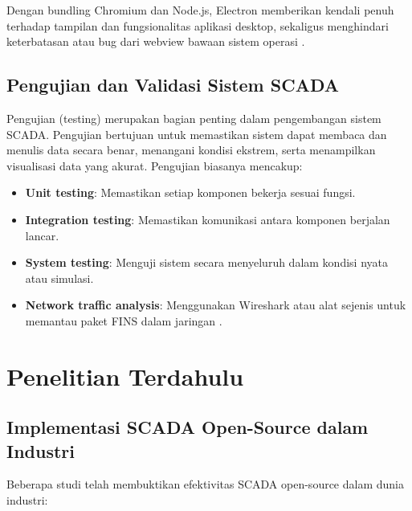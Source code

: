 Dengan bundling Chromium dan Node.js, Electron memberikan kendali penuh terhadap tampilan dan fungsionalitas aplikasi desktop, sekaligus menghindari keterbatasan atau bug dari webview bawaan sistem operasi \parencite{electron2024why}.

\subsection{Pengujian dan Validasi Sistem SCADA}
Pengujian (testing) merupakan bagian penting dalam pengembangan sistem SCADA. Pengujian bertujuan untuk memastikan sistem dapat membaca dan menulis data secara benar, menangani kondisi ekstrem, serta menampilkan visualisasi data yang akurat. Pengujian biasanya mencakup:

\begin{itemize}
    \item \textbf{Unit testing}: Memastikan setiap komponen bekerja sesuai fungsi.
    \item \textbf{Integration testing}: Memastikan komunikasi antara komponen berjalan lancar.
    \item \textbf{System testing}: Menguji sistem secara menyeluruh dalam kondisi nyata atau simulasi.
    \item \textbf{Network traffic analysis}: Menggunakan Wireshark atau alat sejenis untuk memantau paket FINS dalam jaringan \parencite{almas2014open}.
\end{itemize}

\section{Penelitian Terdahulu}

\subsection{Implementasi SCADA Open-Source dalam Industri}
Beberapa studi telah membuktikan efektivitas SCADA open-source dalam dunia industri:


